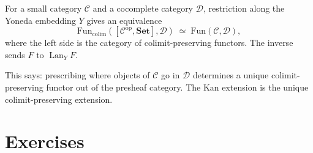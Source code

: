 \begin{theorem}
For a small category $\mathcal{C}$ and a cocomplete category $\mathcal{D}$,
restriction along the Yoneda embedding $Y$ gives an equivalence
\begin{equation*}
  \mathrm{Fun}_{\mathrm{colim}}([\mathcal{C}^{\mathrm{op}}, \mathbf{Set}], \mathcal{D})
  \;\simeq\;
  \mathrm{Fun}(\mathcal{C}, \mathcal{D}),
\end{equation*}
where the left side is the category of colimit-preserving functors. The inverse
sends $F$ to $\operatorname{Lan}_Y F$.
\end{theorem}

This says: prescribing where objects of $\mathcal{C}$ go in $\mathcal{D}$
determines a unique colimit-preserving functor out of the presheaf category.
The Kan extension is the unique colimit-preserving extension.


\section*{Exercises}

